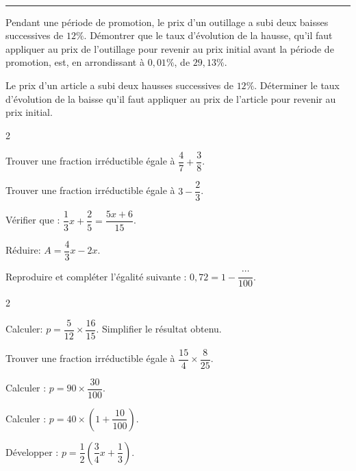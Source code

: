 \documentclass[a4paper,10pt]{book}        %
\begin{document}
\ \\
\mbox{}\hfill\rule{0.8\linewidth}{1pt}\hfill\mbox{}


\begin{enumMet}
	\item Pendant une période de promotion, le prix d'un outillage a subi deux baisses successives de $12 \%$. Démontrer que le taux d'évolution de la hausse, qu'il faut appliquer au prix de l'outillage pour revenir au prix initial avant la période de promotion, est, en arrondissant à $0,01 \%$, de $29,13 \%$.
	\item Le prix d'un article a subi deux hausses successives de $12 \%$. Déterminer le taux d'évolution de la baisse qu'il faut appliquer au prix de l'article pour revenir au prix initial.
\end{enumMet}

\newpage


\begin{multicols}{2}
	\begin{enumMet}
	\item Trouver une fraction irréductible égale à $\dfrac{4}{7}+\dfrac{3}{8}$.
	\item Trouver une fraction irréductible égale à $3-\dfrac{2}{3}$.
	\item Vérifier que : $\dfrac{1}{3} x+\dfrac{2}{5}=\dfrac{5 x+6}{15}$.
	\item Réduire: $A=\dfrac{4}{3} x-2 x$.
	\item Reproduire et compléter l'égalité suivante : $0,72=1-\dfrac{\cdots}{100}$.
\end{enumMet}
\end{multicols}

\begin{multicols}{2}
	\begin{enumMet}
	\item Calculer: $p=\dfrac{5}{12} \times \dfrac{16}{15}$. Simplifier le résultat obtenu.
	\item Trouver une fraction irréductible égale à $\dfrac{15}{4} \times \dfrac{8}{25}$.
	\item Calculer : $p=90 \times \dfrac{30}{100}$.
	\item Calculer : $p=40 \times\left(1+\dfrac{10}{100}\right)$.
	\item Développer : $p=\dfrac{1}{2}\left(\dfrac{3}{4} x+\dfrac{1}{3}\right)$.\\
\end{enumMet}
\end{multicols}
\end{document}
